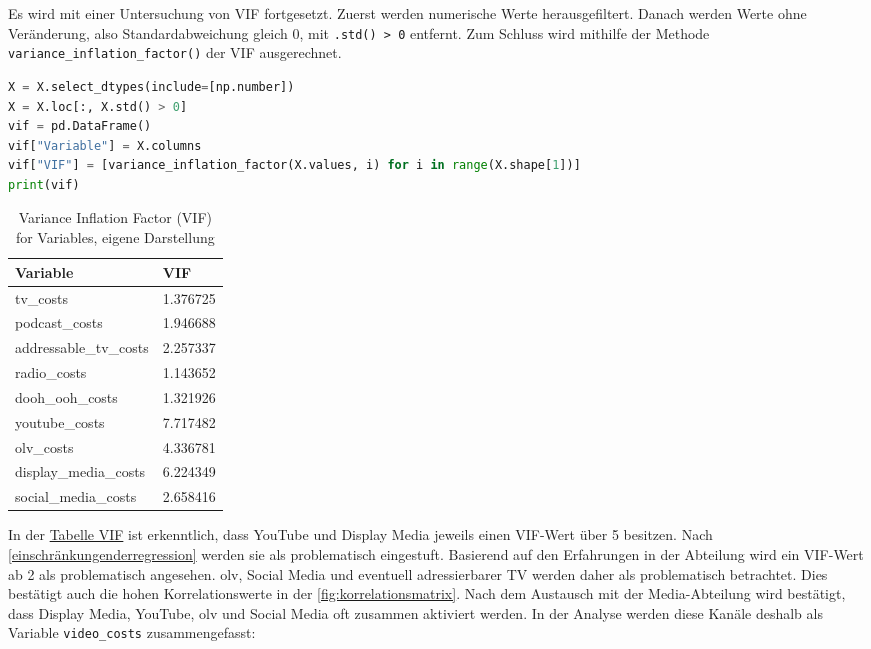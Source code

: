 Es wird mit einer Untersuchung von \ac{VIF} fortgesetzt. Zuerst werden numerische Werte herausgefiltert. Danach werden Werte ohne Veränderung, also Standardabweichung gleich 0, mit \verb|.std() > 0| entfernt. Zum Schluss wird mithilfe der Methode \verb|variance_inflation_factor()| der \ac{VIF} ausgerechnet. 
\begin{lstlisting}[language=Python, linewidth=\textwidth]
X = X.select_dtypes(include=[np.number]) 
X = X.loc[:, X.std() > 0]
vif = pd.DataFrame()
vif["Variable"] = X.columns
vif["VIF"] = [variance_inflation_factor(X.values, i) for i in range(X.shape[1])]
print(vif)
\end{lstlisting}
\begin{table}[h]
    \centering
    \begin{tabular}{@{}ll@{}}
        \toprule
        Variable               & VIF       \\ \midrule
        tv\_costs              & 1.376725  \\
        podcast\_costs         & 1.946688  \\
        addressable\_tv\_costs & 2.257337  \\
        radio\_costs           & 1.143652  \\
        dooh\_ooh\_costs       & 1.321926  \\
        youtube\_costs         & 7.717482  \\
        olv\_costs             & 4.336781  \\
        display\_media\_costs  & 6.224349  \\
        social\_media\_costs   & 2.658416  \\ \bottomrule
    \end{tabular}
    \label{tab:viftabelle}
    \caption{Variance Inflation Factor (VIF) for Variables, eigene Darstellung}
\end{table}
In der \hyperref[tab:viftabelle]{Tabelle VIF} ist erkenntlich, dass YouTube und Display Media jeweils einen \ac{VIF}-Wert über 5 besitzen. Nach \autoref{einschränkungenderregression} werden sie als problematisch eingestuft. Basierend auf den Erfahrungen in der Abteilung wird ein \ac{VIF}-Wert ab 2 als problematisch angesehen. \ac{olv}, Social Media und eventuell adressierbarer TV werden daher als problematisch betrachtet. Dies bestätigt auch die hohen Korrelationswerte in der \autoref{fig:korrelationsmatrix}. Nach dem Austausch mit der Media-Abteilung wird bestätigt, dass Display Media, YouTube, \ac{olv} und Social Media oft zusammen aktiviert werden. In der Analyse werden diese Kanäle deshalb als Variable \verb|video_costs| zusammengefasst: 
